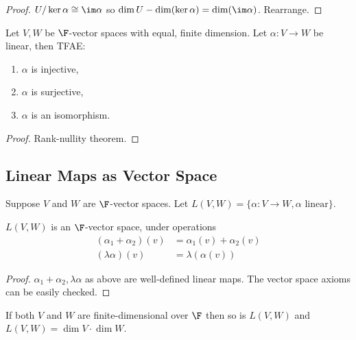 \documentclass[a4paper]{article}
\theoremstyle{definition}
\begin{document}
\begin{proof}
  \(U/\ker \alpha \cong \im \alpha\) so \(\dim U - \dim (\ker \alpha) = \dim (\im \alpha)\). Rearrange.
\end{proof}

\begin{lemma}
  Let \(V, W\) be \(\F\)-vector spaces with equal, finite dimension. Let \(\alpha:V\to W\) be linear, then TFAE:
  \begin{enumerate}
  \item \(\alpha\) is injective,
  \item \(\alpha\) is surjective,
  \item \(\alpha\) is an isomorphism.
  \end{enumerate}
\end{lemma}

\begin{proof}
  Rank-nullity theorem.
\end{proof}

\subsection{Linear Maps as Vector Space}

Suppose \(V\) and \(W\) are \(\F\)-vector spaces. Let \(L(V,W) = \{\alpha:V\to W, \alpha \text{ linear}\}\).

\begin{proposition}
  \(L(V,W)\) is an \(\F\)-vector space, under operations
  \begin{align*}
    (\alpha_1+\alpha_2)(v) &= \alpha_1(v) + \alpha_2(v) \\
    (\lambda\alpha)(v) &= \lambda(\alpha(v))
  \end{align*}
\end{proposition}

\begin{proof}
  \(\alpha_1+\alpha_2, \lambda\alpha\) as above are well-defined linear maps. The vector space axioms can be easily checked.
\end{proof}

\begin{proposition}
  \label{prop:dimension of linear map space}
  If both \(V\) and \(W\) are finite-dimensional over \(\F\) then so is \(L(V,W)\) and \(L(V,W) = \dim V \cdot \dim W\).
\end{proposition}
\end{document}
